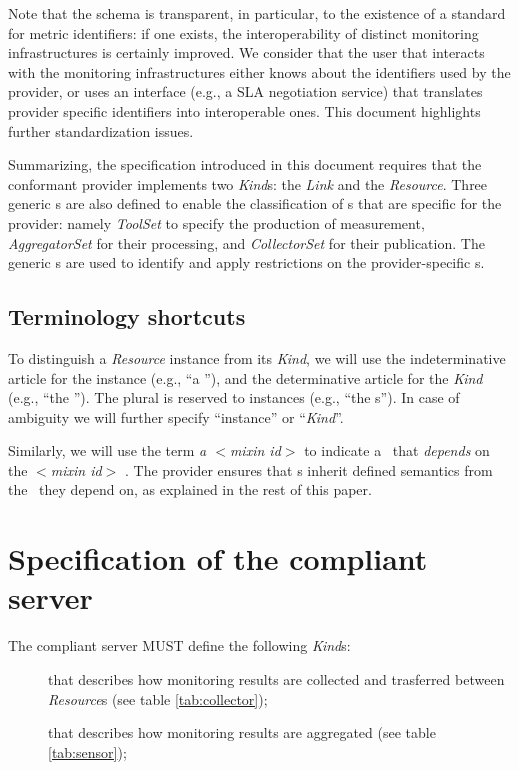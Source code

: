 \documentclass[12pt]{article}  %
\begin{document}
Note that the schema is transparent, in particular, to the existence of a standard for metric identifiers: if one exists, the interoperability of distinct monitoring infrastructures is certainly improved. We consider that the user that interacts with the monitoring infrastructures either knows about the identifiers used by the provider, or uses an interface (e.g., a SLA negotiation service) that translates provider specific identifiers into interoperable ones. This document highlights further standardization issues.

Summarizing, the specification introduced in this document requires that the conformant provider implements two {\em Kind}s: the {\em \coll Link} and the {\em \sens Resource}. Three generic \mi s are also defined to enable the classification of \mi s that are specific for the provider: namely {\em ToolSet} to specify the production of measurement, {\em AggregatorSet} for their processing, and {\em CollectorSet} for their publication. The generic \mi s are used to identify and apply restrictions on the provider-specific \mi s. 

\subsection{Terminology shortcuts}

To distinguish a {\em Resource} instance from its {\em Kind}, we will use the indeterminative article for the instance (e.g., ``a \rs''), and the determinative article for the {\em Kind} (e.g., ``the \rs''). The plural is reserved to instances (e.g., ``the \rs s''). In case of ambiguity we will further specify ``instance'' or ``{\em Kind}''. 

Similarly, we will use the term {\em a $<$mixin id$>$ \mi} to indicate a \mi\ that {\em depends} on the {\em $<$mixin id$>$} \mi. The provider ensures that \mi s inherit defined semantics from the \mi\ they depend on, as explained in the rest of this paper. 

\section{Specification of the compliant server}

The compliant server MUST define the following {\em Kind}s:

\begin{description}

\item [\coll] that describes how monitoring results are collected and trasferred between {\em Resource}s (see table \ref{tab:collector});

\item [\sens] that describes how monitoring results are aggregated (see table  \ref{tab:sensor});

\end{description}
\end{document}
